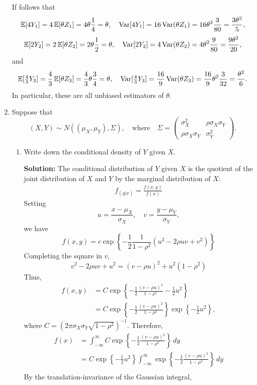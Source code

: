 \documentclass[12pt]{amsart}
\newcommand{\sol}{\bigskip\noindent\textbf{Solution: }}
\begin{document}
\begin{enumerate}
    If follows that
    \[
        \operatorname{\mathbb{E}}[4Y_1] = 4\operatorname{\mathbb{E}}[\theta Z_1] =  4\theta\frac14 = \theta,\quad
        \operatorname{Var}[4Y_1] = 16\operatorname{Var}(\theta Z_1)= 16\theta^2\frac3{80}=\frac{3\theta^2}5,
    \]
    \[
        \operatorname{\mathbb{E}}[2Y_2] = 2\operatorname{\mathbb{E}}[\theta Z_2] =  2\theta\frac12 = \theta,\quad
        \operatorname{Var}[2Y_2] = 4\operatorname{Var}(\theta Z_2)= 4\theta^2\frac9{80}=\frac{9\theta^2}{20},
    \]
    and
    \[
        \operatorname{\mathbb{E}}[\tfrac43Y_3] = \frac43\operatorname{\mathbb{E}}[\theta Z_3] =  \frac43\theta\frac34 = \theta,\quad
        \operatorname{Var}[\tfrac43Y_3] = \frac{16}{9}\operatorname{Var}(\theta Z_3)= \frac{16}{9}\theta^2\frac3{32}=\frac{\theta^2}6.
    \]
    In particular, these are all unbiased estimators of $\theta$.
    \item Suppose that
        \[
    (X,Y)\sim N((\mu_X, \mu_Y), \Sigma),\quad\text{where}\quad
    \Sigma=\begin{pmatrix}\sigma_X^2&\rho\sigma_X\sigma_Y\\\rho\sigma_X\sigma_Y&\sigma_Y^2\end{pmatrix}.
        \]
    \begin{enumerate}
        \setlength{\itemsep}{0.5em}
        \item Write down the conditional density of $Y$ given $X$.
        
        \sol
        The conditional distribution of $Y$ given $X$ is the quotient of the
        joint distribution of $X$ and $Y$ by the marginal distribution of $X$:
        \begin{align*}
            f_(y|x) = \frac{f(x,y)}{f(x)}
        \end{align*}
        Setting
        \[
            u = \frac{x - \mu_X}{\sigma_X},\quad v = \frac{y - \mu_Y}{\sigma_Y},
        \]
        we have
        \[
            f(x,y) = c\exp\left\{-\frac12\frac1{1-\rho^2}\left(u^2 -2\rho u v + v^2\right)\right\}
        \]
        Completing the square in $v$, 
        \[
            v^2 -2\rho u v + u^2 = (v - \rho u)^2 + u^2(1 - \rho^2)
        \]
        Thus,
        \begin{align*}
            f(x,y) &= C\exp\left\{-\frac12\frac{(v - \rho u)^2}{1-\rho^2} - \frac12u^2\right\}\\
            &=  C\exp\left\{-\frac12\frac{(v - \rho u)^2}{1-\rho^2}\right\} \exp\left\{-\frac12u^2\right\},
            \tag{$*$}
        \end{align*}
        where $C = (2\pi\sigma_X\sigma_Y\sqrt{1-\rho^2})^{-1}$.
        Therefore,
        \begin{align*}
            f(x) &= \int_{-\infty}^\infty C\exp\left\{-\frac12\frac{(v - \rho u)^2}{1-\rho^2}\right\}\,dy\\
            &= C\exp\left\{-\frac12u^2\right\}\int_{-\infty}^\infty
            \exp\left\{-\frac12\frac{(v - \rho u)^2}{1-\rho^2}\right\}\,dy\\
        \end{align*}
        By the translation-invariance of the Gaussian integral,
        

\end{enumerate}
\end{enumerate}
\end{document}
